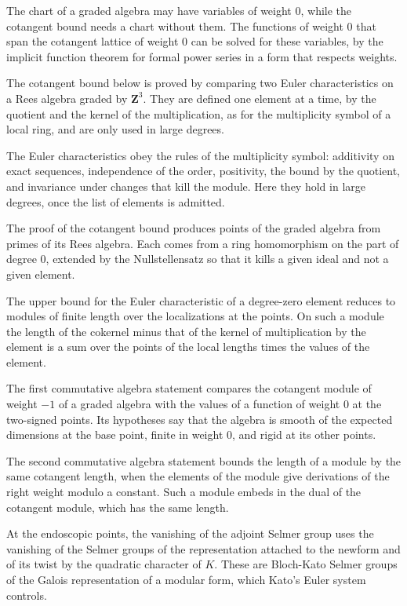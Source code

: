 The chart of a graded algebra may have variables of weight $0$, while the cotangent bound needs a chart without them. The functions of weight $0$ that span the cotangent lattice of weight $0$ can be solved for these variables, by the implicit function theorem for formal power series in a form that respects weights.

The cotangent bound below is proved by comparing two Euler characteristics on a Rees algebra graded by $\mathbf Z^3$. They are defined one element at a time, by the quotient and the kernel of the multiplication, as for the multiplicity symbol of a local ring, and are only used in large degrees.

The Euler characteristics obey the rules of the multiplicity symbol: additivity on exact sequences, independence of the order, positivity, the bound by the quotient, and invariance under changes that kill the module. Here they hold in large degrees, once the list of elements is admitted.

The proof of the cotangent bound produces points of the graded algebra from primes of its Rees algebra. Each comes from a ring homomorphism on the part of degree $0$, extended by the Nullstellensatz so that it kills a given ideal and not a given element.

The upper bound for the Euler characteristic of a degree-zero element reduces to modules of finite length over the localizations at the points. On such a module the length of the cokernel minus that of the kernel of multiplication by the element is a sum over the points of the local lengths times the values of the element.

The first commutative algebra statement compares the cotangent module of weight $-1$ of a graded algebra with the values of a function of weight $0$ at the two-signed points. Its hypotheses say that the algebra is smooth of the expected dimensions at the base point, finite in weight $0$, and rigid at its other points.

The second commutative algebra statement bounds the length of a module by the same cotangent length, when the elements of the module give derivations of the right weight modulo a constant. Such a module embeds in the dual of the cotangent module, which has the same length.

At the endoscopic points, the vanishing of the adjoint Selmer group uses the vanishing of the Selmer groups of the representation attached to the newform and of its twist by the quadratic character of $K$. These are Bloch-Kato Selmer groups of the Galois representation of a modular form, which Kato's Euler system controls.

